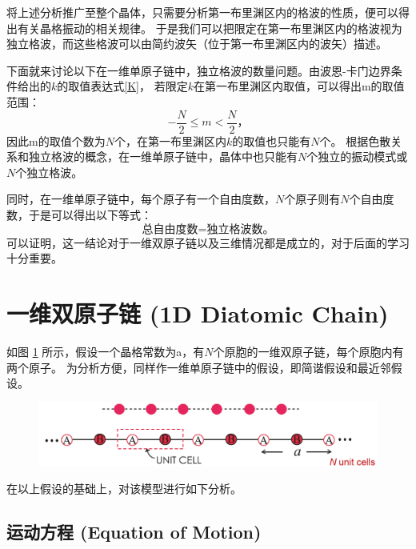 \documentclass[declarePage]{ecnuthesis}
\begin{document}
将上述分析推广至整个晶体，只需要分析第一布里渊区内的格波的性质，便可以得出有关晶格振动的相关规律。%
于是我们可以把限定在第一布里渊区内的格波视为独立格波，而这些格波可以由简约波矢（位于第一布里渊区内的波矢）描述。

下面就来讨论以下在一维单原子链中，独立格波的数量问题。由波恩-卡门边界条件给出的$k$的取值表达式\ref{K}，%
若限定$k$在第一布里渊区内取值，可以得出m的取值范围：
\begin{equation}
    -\frac{N}{2} \le m < \frac{N}{2} \text{，}
\end{equation}
因此m的取值个数为$N$个，在第一布里渊区内$k$的取值也只能有$N$个。
根据色散关系和独立格波的概念，在一维单原子链中，晶体中也只能有$N$个独立的振动模式或$N$个独立格波。

同时，在一维单原子链中，每个原子有一个自由度数，$N$个原子则有$N$个自由度数，于是可以得出以下等式：
\begin{equation}
    \text{总自由度数}=\text{独立格波数} \text{。} \label{3PN}
\end{equation}
可以证明，这一结论对于一维双原子链以及三维情况都是成立的，对于后面的学习十分重要。

\section{一维双原子链 (1D Diatomic Chain)}

如图 \ref{1DDC} 所示，假设一个晶格常数为a，有$N$个原胞的一维双原子链，每个原胞内有两个原子。
为分析方便，同样作一维单原子链中的假设，即简谐假设和最近邻假设。
\begin{figure}[htb]
    \centering
    \includegraphics[width=.7\textwidth]{1DDC.png}
    \label{1DDC}
\end{figure}

在以上假设的基础上，对该模型进行如下分析。

\subsection{运动方程 (Equation of Motion)}
\end{document}
